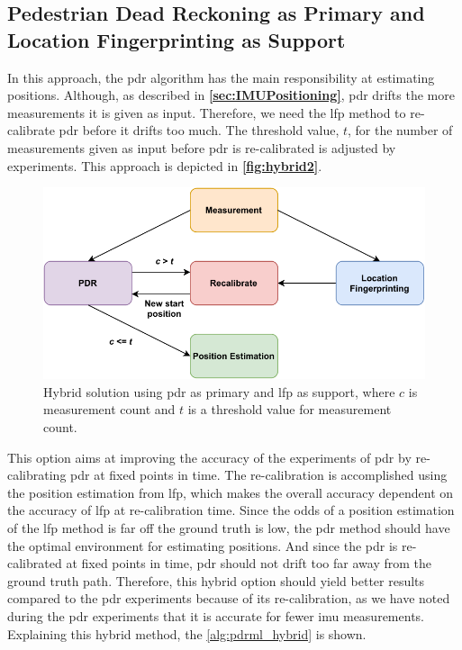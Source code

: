 \subsection{Pedestrian Dead Reckoning as Primary and Location Fingerprinting as Support}
In this approach, the \gls{pdr} algorithm has the main responsibility at estimating positions. Although, as described in \textbf{\autoref{sec:IMUPositioning}}, \gls{pdr} drifts the more measurements it is given as input. Therefore, we need the \gls{lfp} method to re-calibrate \gls{pdr} before it drifts too much. The threshold value, $t$, for the number of measurements given as input before \gls{pdr} is re-calibrated is adjusted by experiments. This approach is depicted in \textbf{\autoref{fig:hybrid2}}.

\begin{figure}[H]
    \centering
    \includegraphics[scale=0.85]{Images/Experiments/hybrid/approach2.pdf}
    \caption{Hybrid solution using \gls{pdr} as primary and \gls{lfp} as support, where $c$ is measurement count and $t$ is a threshold value for measurement count.}
     \label{fig:hybrid2}
\end{figure}

This option aims at improving the accuracy of the experiments of \gls{pdr} by re-calibrating \gls{pdr} at fixed points in time. The re-calibration is accomplished using the position estimation from \gls{lfp}, which makes the overall accuracy dependent on the accuracy of \gls{lfp} at re-calibration time.
Since the odds of a position estimation of the \gls{lfp} method is far off the ground truth is low, the \gls{pdr} method should have the optimal environment for estimating positions. And since the \gls{pdr} is re-calibrated at fixed points in time, \gls{pdr} should not drift too far away from the ground truth path. Therefore, this hybrid option should yield better results compared to the \gls{pdr} experiments because of its re-calibration, as we have noted during the \gls{pdr} experiments that it is accurate for fewer \gls{imu} measurements. Explaining this hybrid method, the \autoref{alg:pdrml_hybrid} is shown.


